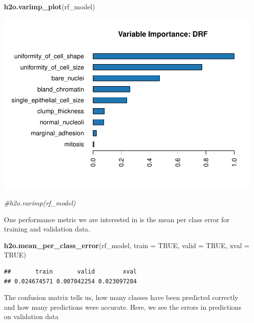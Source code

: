 \documentclass[]{article}
\newenvironment{Shaded}{\begin{snugshade}}{\end{snugshade}}
\newcommand{\KeywordTok}[1]{\textcolor[rgb]{0.13,0.29,0.53}{\textbf{{#1}}}}
\newcommand{\DataTypeTok}[1]{\textcolor[rgb]{0.13,0.29,0.53}{{#1}}}
\newcommand{\CommentTok}[1]{\textcolor[rgb]{0.56,0.35,0.01}{\textit{{#1}}}}
\newcommand{\OtherTok}[1]{\textcolor[rgb]{0.56,0.35,0.01}{{#1}}}
\newcommand{\NormalTok}[1]{{#1}}
\begin{document}
\begin{Shaded}
\begin{Highlighting}[]
\KeywordTok{h2o.varimp_plot}\NormalTok{(rf_model)}
\end{Highlighting}
\end{Shaded}

\includegraphics{webinar_code_files/figure-latex/unnamed-chunk-50-1.pdf}

\begin{Shaded}
\begin{Highlighting}[]
\CommentTok{#h2o.varimp(rf_model)}
\end{Highlighting}
\end{Shaded}

One performance metric we are interested in is the mean per class error
for training and validation data.

\begin{Shaded}
\begin{Highlighting}[]
\KeywordTok{h2o.mean_per_class_error}\NormalTok{(rf_model, }\DataTypeTok{train =} \OtherTok{TRUE}\NormalTok{, }\DataTypeTok{valid =} \OtherTok{TRUE}\NormalTok{, }\DataTypeTok{xval =} \OtherTok{TRUE}\NormalTok{)}
\end{Highlighting}
\end{Shaded}

\begin{verbatim}
##       train       valid        xval 
## 0.024674571 0.007042254 0.023097284
\end{verbatim}

The confusion matrix tells us, how many classes have been predicted
correctly and how many predictions were accurate. Here, we see the
errors in predictions on validation data
\end{document}
